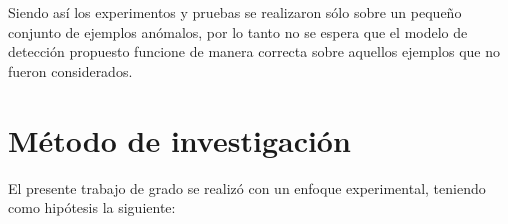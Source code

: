 \vspace{5mm} %

Siendo as\'{i} los experimentos y pruebas se realizaron s\'{o}lo sobre un peque\~{n}o conjunto de ejemplos an\'{o}malos, por lo tanto no se espera que el modelo de detecci\'{o}n propuesto funcione de manera correcta sobre aquellos ejemplos que no fueron considerados.

\section{M\'{e}todo de investigaci\'{o}n}

El presente trabajo de grado se realiz\'{o} con un enfoque experimental, teniendo como hip\'{o}tesis la siguiente:

